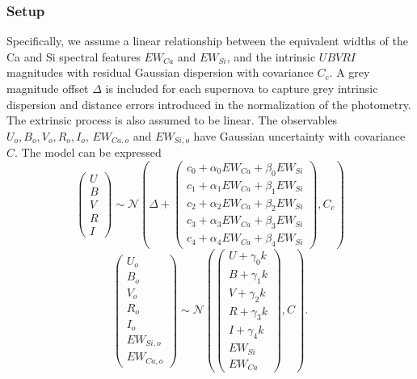 \documentclass[11pt, oneside]{article}   	%
\begin{document}
\subsubsection{Setup}
Specifically, we assume a linear relationship between the equivalent widths of the Ca and Si spectral features
$EW_{Ca}$ and $EW_{Si}$, and the intrinsic $UBVRI$ magnitudes
with residual Gaussian dispersion with covariance $C_c$.  A grey magnitude offset $\Delta$ is included for each supernova
to capture grey intrinsic dispersion and distance errors introduced in the normalization of the photometry.
The  extrinsic process is also assumed to be linear.  The observables
$U_o, B_o, V_o, R_o, I_o$, $EW_{Ca,o}$ and $EW_{Si,o}$ have Gaussian uncertainty with covariance $C$.  The model can be expressed
\begin{equation}
\left(
\begin{matrix}
U\\B\\V\\R\\I
\end{matrix}
\right) \sim \mathcal{N}
\left(
\Delta +
\left(
\begin{matrix}
c_0+\alpha_0 EW_{Ca} + \beta_0 EW_{Si} \\
c_1+\alpha_1 EW_{Ca} + \beta_1 EW_{Si}  \\
c_2+\alpha_2 EW_{Ca} + \beta_2 EW_{Si} \\
c_3+\alpha_3 EW_{Ca} + \beta_3 EW_{Si} \\
c_4+\alpha_4 EW_{Ca} + \beta_4 EW_{Si}
\end{matrix}
\right)
,C_{c}
\right)
\label{ew:eqn}
\end{equation}
\begin{equation}
\left(
\begin{matrix}
U_o\\B_o\\ V_o\\R_o\\I_o\\EW_{Si, o}\\ EW_{Ca, o}\end{matrix}
\right) \sim \mathcal{N}
\left(
\left(
\begin{matrix}
U +\gamma_0 k \\B +\gamma_1 k \\V+\gamma_2 k\\R+\gamma_3 k\\I+\gamma_4 k\\
EW_{Si}\\ EW_{Ca}
\end{matrix}
\right)
,C
\right).
\label{dust:eqn}
\end{equation}
\end{document}
